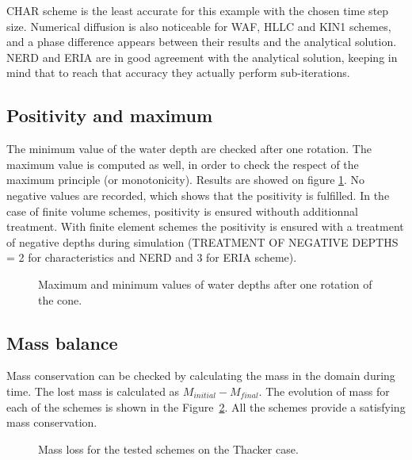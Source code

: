 CHAR scheme is the least accurate for this example with the chosen time step size.
Numerical diffusion is also noticeable for WAF, HLLC and KIN1 schemes, and a phase difference appears between their results and the analytical solution.
NERD and ERIA are in good agreement with the analytical solution, keeping in mind that to reach that accuracy they actually perform sub-iterations.

\subsection{Positivity and maximum}

The minimum value of the water depth are checked after one rotation. 
The maximum value is computed as well, in order to check the respect of the maximum principle (or monotonicity). 
Results are showed on figure \ref{t2d:thacker:minmax}. 
No negative values are recorded, which shows that the positivity is fulfilled.
In the case of finite volume schemes, positivity is ensured withouth additionnal treatment.
With finite element schemes the positivity is ensured with a treatment of negative depths
during simulation (TREATMENT OF NEGATIVE DEPTHS = 2 for characteristics and NERD and 3 for ERIA scheme).

\begin{figure}[H]
\centering
{}
\caption{Maximum and minimum values of water depths after one rotation of the cone.}
\label{t2d:thacker:minmax}
\end{figure}

\subsection{Mass balance}

Mass conservation can be checked by calculating the mass in the domain during time.
The lost mass is calculated as $M_{initial} - M_{final}$.
The evolution of mass for each of the schemes is shown in the Figure~\ref{fig:thacker:VoLTime}.
All the schemes provide a satisfying mass conservation.

\begin{figure}[H]
\centering
  \caption{Mass loss for the tested schemes on the Thacker case.}
\label{fig:thacker:VoLTime}
\end{figure}

